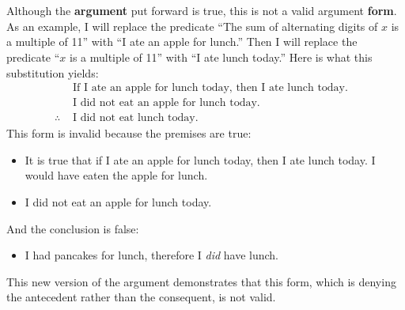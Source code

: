 \documentclass{article}
\begin{document}
\section{}
\subsection{}
Although the \textbf{argument} put forward is true, this is not a valid
argument \textbf{form}. \\ As an example, I will replace the predicate ``The
sum of alternating digits of $ x $ is a multiple of 11'' with ``I ate an apple
for lunch.'' Then I will replace the predicate ``$ x $ is a multiple of 11''
with ``I ate lunch today.'' Here is what this substitution yields:
\begin{align*}
               &  \text{ If I ate an apple for lunch today, then I ate lunch today.} & \\
               &  \text{ I did not eat an apple for lunch today.}                    & \\
    \therefore &  \text{ I did not eat lunch today.}                                 &
\end{align*}
This form is invalid because the premises are true:
\begin{itemize}
    \item It is true that if I ate an apple for lunch today, then I ate lunch today. I
          would have eaten the apple for lunch.
    \item I did not eat an apple for lunch today.
\end{itemize}
And the conclusion is false:
\begin{itemize}
    \item I had pancakes for lunch, therefore I \emph{did} have lunch.
\end{itemize}
This new version of the argument demonstrates that this form, which is denying the antecedent rather than the consequent, is not valid.
\end{document}
